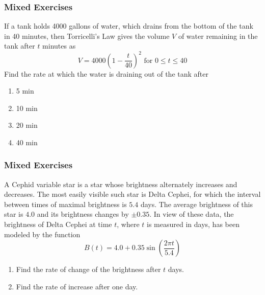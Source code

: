 \documentclass[xcolor=dvipsnames]{beamer}
\begin{document}
\begin{frame}
  \frametitle{Mixed Exercises}
  {\ubung} If a tank holds 4000 gallons of water, which drains from the bottom
  of the tank in 40 minutes, then Torricelli's Law gives the volume $V$
  of water remaining in the tank after $t$ minutes as
  \begin{equation}
    \label{eq:oothaich}
  V=4000\left(1−\frac{t}{40}\right)^{2}\mbox{ for }0\leq{}t\leq{}40  
  \end{equation}
  Find the rate at which the water is draining out of the tank after
  \begin{enumerate}
  \item 5 min
  \item 10 min
  \item 20 min
  \item 40 min
  \end{enumerate}
\end{frame}

\begin{frame}
  \frametitle{Mixed Exercises}
  {\ubung} A Cephid variable star is a star whose brightness alternately
  increases and decreases. The most easily visible such star is Delta
  Cephei, for which the interval between times of maximal brightness
  is $5.4$ days. The average brightness of this star is $4.0$ and its
  brightness changes by $\pm{}0.35$. In view of these data, the
  brightness of Delta Cephei at time $t$, where $t$ is measured in
  days, has been modeled by the function
  \begin{equation}
    \label{eq:duusecho}
    B(t)=4.0+0.35\sin(\frac{2\pi{}t}{5.4})  
  \end{equation}
  \begin{enumerate}
  \item Find the rate of change of the brightness after $t$ days.
  \item Find the rate of increase after one day.
  \end{enumerate}
\end{frame}

\end{document}

